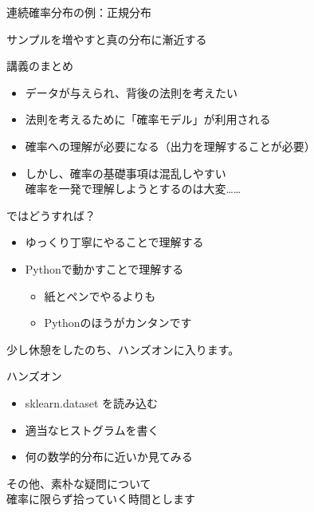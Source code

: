 \documentclass[dvipdfmx,cjk]{beamer}
\begin{document}
\begin{frame}{連続確率分布の例：正規分布}


\end{frame}


\begin{frame}{サンプルを増やすと真の分布に漸近する}


\end{frame}



\begin{frame}{講義のまとめ} \pause

\begin{itemize}
    \item データが与えられ、背後の法則を考えたい \pause
    \item 法則を考えるために「確率モデル」が利用される \pause
    \item 確率への理解が必要になる（出力を理解することが必要） \pause
    \item しかし、確率の基礎事項は混乱しやすい\\
          確率を一発で理解しようとするのは大変…… \pause
\end{itemize}

\vskip 1cm
ではどうすれば？ \pause

\begin{itemize}
    \item ゆっくり丁寧にやることで理解する \pause
    \item Pythonで動かすことで理解する \pause
        \begin{itemize}
        \item 紙とペンでやるよりも
        \item Pythonのほうがカンタンです
        \end{itemize}
\end{itemize} \pause

\vskip 1cm
少し休憩をしたのち、ハンズオンに入ります。

\end{frame}


\begin{frame}{ハンズオン} \pause

\begin{itemize}
    \item sklearn.dataset を読み込む \pause
    \item 適当なヒストグラムを書く \pause
    \item 何の数学的分布に近いか見てみる \pause
\end{itemize}

\vskip 1cm
その他、素朴な疑問について\\確率に限らず拾っていく時間とします

\end{frame}


\end{document}
